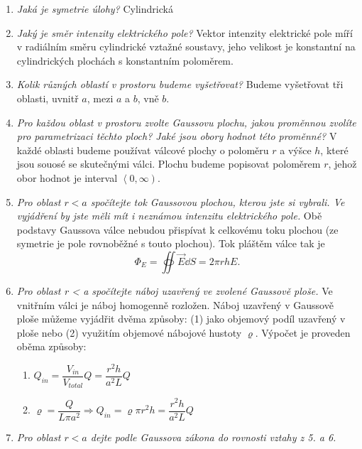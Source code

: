 \begin{example}
  \begin{enumerate}
    \item \emph{Jaká je symetrie úlohy?} Cylindrická
    \item \emph{Jaký je směr intenzity elektrického pole?} Vektor intenzity elektrické pole 
          míří v radiálním směru cylindrické vztažné soustavy, jeho velikost je konstantní na 
          cylindrických plochách s konstantním poloměrem. 
    \item \emph{Kolik různých oblastí v prostoru budeme vyšetřovat?} Budeme vyšetřovat tři 
          oblasti, uvnitř \(a\), mezi \(a\) a \(b\), vně \(b\).
    \item \emph{Pro každou oblast v prostoru zvolte Gaussovu plochu, jakou proměnnou zvolíte
          pro parametrizaci těchto ploch? Jaké jsou obory hodnot této proměnné?}
          V každé oblasti budeme používat válcové plochy o poloměru \(r\) a výšce \(h\), 
          které jsou souosé se skutečnými válci. Plochu budeme popisovat poloměrem \(r\), 
          jehož obor hodnot je interval \(\left\langle 0,\infty\right)\).
    \item \emph{Pro oblast \(r < a\) spočítejte tok Gaussovou plochou, kterou jste si 
          vybrali. Ve vyjádření by jste měli mít i neznámou intenzitu elektrického pole.} Obě 
          podstavy Gaussova válce nebudou přispívat k celkovému toku plochou (ze         
          symetrie je pole rovnoběžné s touto plochou). Tok pláštěm válce tak je
          \begin{equation*}
            \Phi_E = \oiint\vec{E}\dd{S} = 2\pi r h E.
          \end{equation*}
    \item \emph{Pro oblast r < a spočítejte náboj uzavřený ve zvolené Gaussově ploše.}
          Ve vnitřním válci je náboj homogenně rozložen. Náboj uzavřený v Gaussově ploše   
          můžeme vyjádřit dvěma způsoby: (1) jako objemový podíl uzavřený v ploše nebo (2)   
          využitím objemové nábojové hustoty \(\varrho\). Výpočet je proveden oběma způsoby:
          \begin{enumerate}
            \item \(Q_{in} = \dfrac{V_{in}}{V_{total}}Q = \dfrac{r^2h}{a^2L}Q\)
            \item \(\varrho = \dfrac{Q}{L\pi a^2} 
                             \Rightarrow Q_{in} = \varrho\pi r^2h = \dfrac{r^2h}{a^2L}Q
                  \)
          \end{enumerate}
    \item \emph{Pro oblast \(r < a\) dejte podle Gaussova zákona do rovnosti vztahy z 5. a 6. 
}
\end{enumerate}
\end{example}
